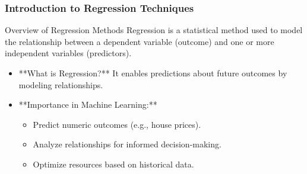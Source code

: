 \documentclass[aspectratio=169]{beamer}
\begin{document}
\frame{\titlepage}

\begin{frame}[fragile]
    \maketitle
\end{frame}

\begin{frame}[fragile]
    \frametitle{Introduction to Regression Techniques}
    \begin{block}{Overview of Regression Methods}
        Regression is a statistical method used to model the relationship between a dependent variable (outcome) and one or more independent variables (predictors).
    \end{block}
    \begin{itemize}
        \item **What is Regression?** It enables predictions about future outcomes by modeling relationships.
        \item **Importance in Machine Learning:**
        \begin{itemize}
            \item Predict numeric outcomes (e.g., house prices).
            \item Analyze relationships for informed decision-making.
            \item Optimize resources based on historical data.
        \end{itemize}
    \end{itemize}
\end{frame}
\end{document}
